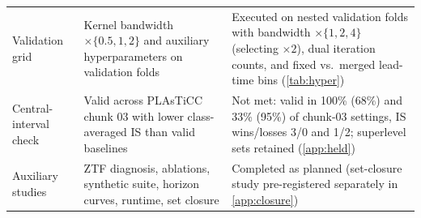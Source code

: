 \begin{longtable}{p{2.5cm}p{4.2cm}p{8.3cm}}
Validation grid & Kernel bandwidth $\times\{0.5,1,2\}$ and auxiliary hyperparameters on validation folds & Executed on nested validation folds with bandwidth $\times\{1,2,4\}$ (selecting $\times2$), dual iteration counts, and fixed vs.\ merged lead-time bins (\cref{tab:hyper}) \\
Central-interval check & Valid across PLAsTiCC chunk 03 with lower class-averaged IS than valid baselines & Not met: valid in 100\% (68\%) and 33\% (95\%) of chunk-03 settings, IS wins/losses 3/0 and 1/2; superlevel sets retained (\cref{app:held}) \\
Auxiliary studies & ZTF diagnosis, ablations, synthetic suite, horizon curves, runtime, set closure & Completed as planned (set-closure study pre-registered separately in \cref{app:closure}) \\
\bottomrule
\end{longtable}
\par\endgroup
